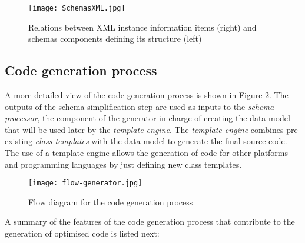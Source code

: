 \documentclass{sig-alternate}
\begin{document}
\begin{figure}
\centering
  \texttt{[image: SchemasXML.jpg]}\\
  \caption{Relations between XML instance information items (right) and schemas components defining its structure (left)}\label{fig:simplificationAlg}
\end{figure} 

\begin{sloppypar}

\end{sloppypar}

\subsection{Code generation process}

A more detailed view of the code generation process is shown in Figure \ref{fig:flow_gen}. The outputs of the schema simplification step are used as inputs to the \textit{schema processor}, the component of the generator in charge of creating the data model that will be used later by the \textit{template engine}. The \textit{template engine} combines pre-existing \textit{class templates} with the data model to generate the final source code. The use of a template engine allows the generation of code for other platforms and programming languages by just defining new class templates. 


\begin{figure}
\centering
  \texttt{[image: flow-generator.jpg]}\\
  \caption{Flow diagram for the code generation process}\label{fig:flow_gen}
\end{figure}  



A summary of the features of the code generation process that contribute to the generation of optimised code is listed next: 
\end{document}
